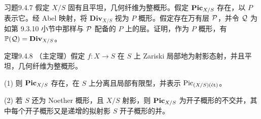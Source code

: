 \begin{origstatement}{习题}{9.4.7}\label{ch09s04:9.4.7}
假定 $X/S$ 固有且平坦，几何纤维为整概形。假定 $\mathbf{Pic}_{X/S}$ 存在，以 $P$ 表示它。经 Abel 映射，将 $\mathbf{Div}_{X/S}$ 视为 $P$ 概形。假定存在万有层 $\mathcal P$，并令 $\mathcal Q$ 为如第 9.3.10 小节中那样与 $\mathcal P$ 配备的 $P$ 上的层。证明，作为 $P$ 概形，有 $\mathbb P(\mathcal Q)=\mathbf{Div}_{X/S}$。
\end{origstatement}
\begin{origstatement}{定理}{9.4.8}\label{ch09s04:9.4.8}
（主定理）假定 $f:X\to S$ 在 $S$ 上 Zariski 局部地为射影态射，并且平坦，几何纤维为整概形。

(1) 则 $\mathbf{Pic}_{X/S}$ 存在，在 $S$ 上分离且局部有限型，并表示 $\operatorname{Pic}_{(X/S)(\text{\'et})}$。

(2) 若 $S$ 还为 Noether 概形，且 $X/S$ 射影，则 $\mathbf{Pic}_{X/S}$ 为开子概形的不交并，其中每个开子概形又是递增的拟射影 $S$ 开子概形的并。
\end{origstatement}
